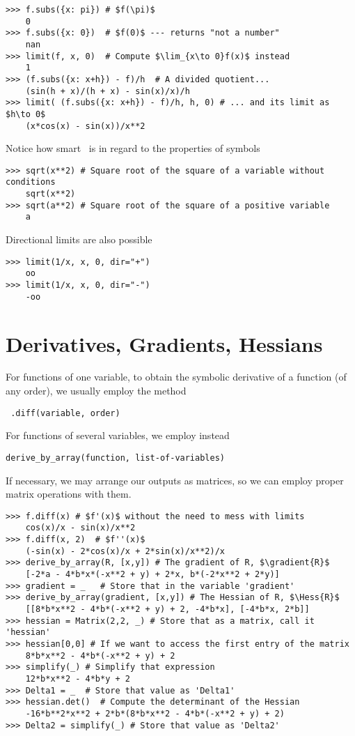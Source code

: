 \begin{verbatim}
>>> f.subs({x: pi}) # $f(\pi)$
	0
>>> f.subs({x: 0})  # $f(0)$ --- returns "not a number"
	nan
>>> limit(f, x, 0)  # Compute $\lim_{x\to 0}f(x)$ instead
	1
>>> (f.subs({x: x+h}) - f)/h  # A divided quotient...
	(sin(h + x)/(h + x) - sin(x)/x)/h
>>> limit( (f.subs({x: x+h}) - f)/h, h, 0) # ... and its limit as $h\to 0$
	(x*cos(x) - sin(x))/x**2
\end{verbatim}

Notice how smart \sympy\ is in regard to the properties of symbols
\begin{verbatim}
>>> sqrt(x**2) # Square root of the square of a variable without conditions
	sqrt(x**2)
>>> sqrt(a**2) # Square root of the square of a positive variable
	a
\end{verbatim}

Directional limits are also possible
\begin{verbatim}
>>> limit(1/x, x, 0, dir="+")
	oo
>>> limit(1/x, x, 0, dir="-")
	-oo
\end{verbatim}

\section{Derivatives, Gradients, Hessians}
For functions of one variable, to obtain the symbolic derivative of a function (of any order), we usually employ the method 
\begin{verbatim} .diff(variable, order) \end{verbatim}
For functions of several variables, we employ instead 
\begin{verbatim}derive_by_array(function, list-of-variables) \end{verbatim}
If necessary, we may arrange our outputs as matrices, so we can employ proper matrix operations with them.

\begin{verbatim}
>>> f.diff(x) # $f'(x)$ without the need to mess with limits
	cos(x)/x - sin(x)/x**2
>>> f.diff(x, 2)  # $f''(x)$
	(-sin(x) - 2*cos(x)/x + 2*sin(x)/x**2)/x
>>> derive_by_array(R, [x,y]) # The gradient of R, $\gradient{R}$
	[-2*a - 4*b*x*(-x**2 + y) + 2*x, b*(-2*x**2 + 2*y)]
>>> gradient = _   # Store that in the variable 'gradient'
>>> derive_by_array(gradient, [x,y]) # The Hessian of R, $\Hess{R}$
	[[8*b*x**2 - 4*b*(-x**2 + y) + 2, -4*b*x], [-4*b*x, 2*b]]
>>> hessian = Matrix(2,2, _) # Store that as a matrix, call it 'hessian'
>>> hessian[0,0] # If we want to access the first entry of the matrix
	8*b*x**2 - 4*b*(-x**2 + y) + 2
>>> simplify(_) # Simplify that expression
	12*b*x**2 - 4*b*y + 2
>>> Delta1 = _  # Store that value as 'Delta1'
>>> hessian.det()  # Compute the determinant of the Hessian
	-16*b**2*x**2 + 2*b*(8*b*x**2 - 4*b*(-x**2 + y) + 2)
>>> Delta2 = simplify(_) # Store that value as 'Delta2'
\end{verbatim}

